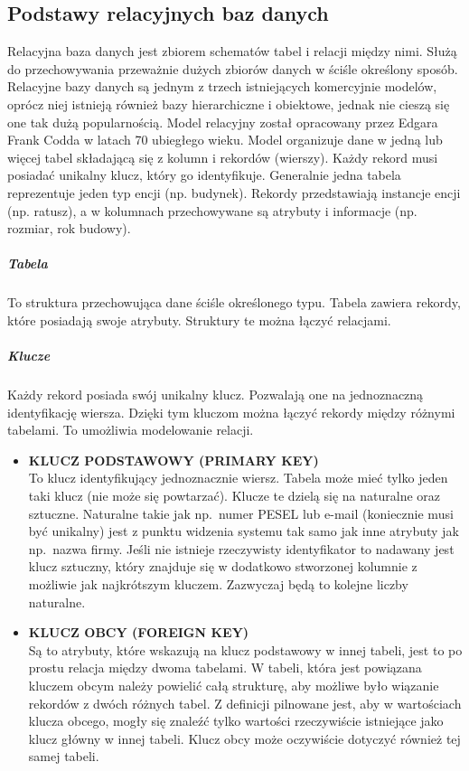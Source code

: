 \documentclass[polish, 11pt]{article}
\begin{document}
    \subsection{Podstawy relacyjnych baz danych}
    Relacyjna baza danych jest zbiorem schematów tabel i relacji między nimi. Służą do przechowywania przeważnie dużych 
    zbiorów danych w ściśle określony sposób.
    Relacyjne bazy danych są jednym z trzech istniejących komercyjnie modelów, oprócz niej istnieją również bazy hierarchiczne
    i obiektowe, jednak nie cieszą się one tak dużą popularnością. Model relacyjny został opracowany przez Edgara Frank Codda
    w latach 70 ubiegłego wieku.
    Model organizuje dane w jedną lub więcej tabel składającą się z kolumn i rekordów (wierszy). Każdy rekord musi posiadać
    unikalny klucz, który go identyfikuje. Generalnie jedna tabela reprezentuje jeden typ encji (np. budynek).
    Rekordy przedstawiają instancje encji (np. ratusz), a w kolumnach przechowywane są atrybuty i informacje (np. rozmiar, rok budowy).
    	\subparagraph{Tabela\\}
    	To struktura przechowująca dane ściśle określonego typu. Tabela zawiera rekordy, które posiadają swoje atrybuty.
    	Struktury te można łączyć relacjami.
	  	\subparagraph{Klucze\\}
  		Każdy rekord posiada swój unikalny klucz. Pozwalają one na jednoznaczną identyfikację wiersza.
  	 Dzięki tym kluczom można łączyć rekordy między różnymi tabelami. To umożliwia modelowanie relacji. 
  		\begin{itemize}
  	 	\item \textbf{KLUCZ PODSTAWOWY (PRIMARY KEY)}\\
  	 	 To klucz identyfikujący jednoznacznie wiersz. Tabela może mieć tylko jeden taki klucz (nie może się powtarzać).
  	 	 Klucze te dzielą się na naturalne oraz sztuczne. Naturalne takie jak np.\ numer PESEL lub e-mail (koniecznie musi być unikalny) 
  	 	 jest z punktu widzenia systemu tak samo jak inne atrybuty jak np.\ nazwa firmy. Jeśli nie istnieje rzeczywisty identyfikator 
  	 	 to nadawany jest klucz sztuczny, który znajduje się w dodatkowo stworzonej kolumnie z możliwie jak najkrótszym kluczem.
  	 	 Zazwyczaj będą to kolejne liczby naturalne. 
  	 	 \item \textbf{KLUCZ OBCY (FOREIGN KEY)}\\
  	 	 Są to atrybuty, które wskazują na klucz podstawowy w innej tabeli, jest to po prostu relacja między dwoma tabelami.
  	 	 W tabeli, która jest powiązana kluczem obcym należy powielić całą strukturę, aby możliwe było wiązanie rekordów z
  	 	 dwóch różnych tabel. Z definicji pilnowane jest, aby w wartościach klucza obcego, mogły się znaleźć tylko wartości
  	 	 rzeczywiście istniejące jako klucz główny w innej tabeli. Klucz obcy może oczywiście dotyczyć również tej samej tabeli.
  	 	\end{itemize}
  	 	
\end{document}
